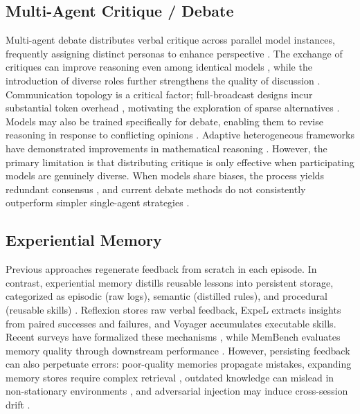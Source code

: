 \subsection{Multi-Agent Critique / Debate}%
\label{sec:multi-agent-critique}
Multi-agent debate distributes verbal critique across parallel model instances, frequently assigning distinct personas to enhance perspective \citep{hong2024metagpt}. The exchange of critiques can improve reasoning even among identical models \citep{du2023debate}, while the introduction of diverse roles further strengthens the quality of discussion \citep{chan2023chatevalbetterllmbasedevaluators}. Communication topology is a critical factor; full-broadcast designs incur substantial token overhead \citep{choi2026debate}, motivating the exploration of sparse alternatives \citep{li2024improving}. Models may also be trained specifically for debate, enabling them to revise reasoning in response to conflicting opinions \citep{liu2026learningselfdebatepreparingreasoning}. Adaptive heterogeneous frameworks have demonstrated improvements in mathematical reasoning \citep{zhou2025adaptive}. However, the primary limitation is that distributing critique is only effective when participating models are genuinely diverse. When models share biases, the process yields redundant consensus \citep{estornell2024multi, liang2024encouragingdivergentthinkinglarge}, and current debate methods do not consistently outperform simpler single-agent strategies \citep{choi2026debate}.


\subsection{Experiential Memory}%
\label{sec:experiential Memory}


Previous approaches regenerate feedback from scratch in each episode. In contrast, experiential memory distills reusable lessons into persistent storage, categorized as episodic (raw logs), semantic (distilled rules), and procedural (reusable skills) \citep{zhang2025survey}.  Reflexion \citep{shinn2023reflexion} stores raw verbal feedback, ExpeL \citep{zhao2024expel} extracts insights from paired successes and failures, and Voyager \citep{wang2023voyager} accumulates executable skills. Recent surveys have formalized these mechanisms \citep{du2026memory}, while MemBench evaluates memory quality through downstream performance \citep{tan2025membench}. However, persisting feedback can also perpetuate errors: poor-quality memories propagate mistakes, expanding memory stores require complex retrieval \citep{park2023genagents}, outdated knowledge can mislead in non-stationary environments \citep{zhang2025survey}, and adversarial injection may induce cross-session drift \citep{dong2026memory}.





